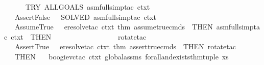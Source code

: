 \begin{isabellebody}
\ \ \ \ \ \ TRY\ {\isacharparenleft}{\kern0pt}ALLGOALS\ {\isacharparenleft}{\kern0pt}asm{\isacharunderscore}{\kern0pt}full{\isacharunderscore}{\kern0pt}simp{\isacharunderscore}{\kern0pt}tac\ ctxt{\isacharparenright}{\kern0pt}{\isacharparenright}{\kern0pt}\isanewline
\ \ {\isacharbar}{\kern0pt}\ {\isacharparenleft}{\kern0pt}AssertFalse{\isacharcomma}{\kern0pt}\ {\isacharunderscore}{\kern0pt}{\isacharparenright}{\kern0pt}\ {\isacharequal}{\kern0pt}{\isachargreater}{\kern0pt}\ SOLVED{\isacharprime}{\kern0pt}\ {\isacharparenleft}{\kern0pt}asm{\isacharunderscore}{\kern0pt}full{\isacharunderscore}{\kern0pt}simp{\isacharunderscore}{\kern0pt}tac\ ctxt{\isacharparenright}{\kern0pt}\ {}\isanewline
\ \ {\isacharbar}{\kern0pt}\ {\isacharparenleft}{\kern0pt}AssumeTrue{\isacharcomma}{\kern0pt}\ {\isacharunderscore}{\kern0pt}{\isacharparenright}{\kern0pt}\ {\isacharequal}{\kern0pt}{\isachargreater}{\kern0pt}\ {\isacharparenleft}{\kern0pt}eresolve{\isacharunderscore}{\kern0pt}tac\ ctxt\ {\isacharbrackleft}{\kern0pt}{\isacharat}{\kern0pt}{\isacharbraceleft}{\kern0pt}thm\ assume{\isacharunderscore}{\kern0pt}true{\isacharunderscore}{\kern0pt}cmds{\isacharbraceright}{\kern0pt}{\isacharbrackright}{\kern0pt}\ {}{\isacharparenright}{\kern0pt}\ THEN\ {\isacharparenleft}{\kern0pt}asm{\isacharunderscore}{\kern0pt}full{\isacharunderscore}{\kern0pt}simp{\isacharunderscore}{\kern0pt}tac\ ctxt\ {}{\isacharparenright}{\kern0pt}\ THEN\isanewline
\ \ \ \ \ \ \ \ \ \ \ \ \ \ \ \ \ \ rotate{\isacharunderscore}{\kern0pt}tac\ {}\ {}\isanewline
\ \ {\isacharbar}{\kern0pt}\ {\isacharparenleft}{\kern0pt}AssertTrue{\isacharcomma}{\kern0pt}\ {\isacharunderscore}{\kern0pt}{\isacharparenright}{\kern0pt}\ {\isacharequal}{\kern0pt}{\isachargreater}{\kern0pt}\ {\isacharparenleft}{\kern0pt}eresolve{\isacharunderscore}{\kern0pt}tac\ ctxt\ {\isacharbrackleft}{\kern0pt}{\isacharat}{\kern0pt}{\isacharbraceleft}{\kern0pt}thm\ assert{\isacharunderscore}{\kern0pt}true{\isacharunderscore}{\kern0pt}cmds{\isacharbraceright}{\kern0pt}{\isacharbrackright}{\kern0pt}\ {}{\isacharparenright}{\kern0pt}\ THEN\ {\isacharparenleft}{\kern0pt}rotate{\isacharunderscore}{\kern0pt}tac\ {}\ {}{\isacharparenright}{\kern0pt}\isanewline
\ \ {\isacharparenright}{\kern0pt}\ THEN\isanewline
\ \ \ boogie{\isacharunderscore}{\kern0pt}vc{\isacharunderscore}{\kern0pt}tac\ ctxt\ global{\isacharunderscore}{\kern0pt}assms\ forall{\isacharunderscore}{\kern0pt}and{\isacharunderscore}{\kern0pt}exists{\isacharunderscore}{\kern0pt}thm{\isacharunderscore}{\kern0pt}tuple\ xs\isanewline
{\isacartoucheclose}%
\endisatagML
{\isafoldML}%
%
\isadelimML
%
\endisadelimML
\isanewline
%
\isadelimtheory
\isanewline
%
\endisadelimtheory
%
\isatagtheory
{}\isamarkupfalse%
%
\endisatagtheory
{\isafoldtheory}%
%
\isadelimtheory
%
\endisadelimtheory
%
\end{isabellebody}%
